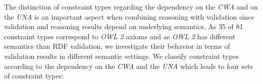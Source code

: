 \documentclass{acm_proc_article-sp}
\newcommand{\ms}[1]{%
  \texttt{#1}
}
\begin{document}
The distinction of constraint types regarding the dependency on the \emph{CWA} and on the \emph{UNA} is an important aspect when combining reasoning with validation
since validation and reasoning results depend on underlying semantics.
As 35 of 81 constraint types correspond to \emph{OWL 2} axioms and as \emph{OWL 2} has different semantics than RDF validation, 
we investigate their behavior in terms of validation results in different semantic settings. 
We classify constraint types according to the dependency on the \emph{CWA} and the \emph{UNA} which leads to four sets of constraint types:
\end{document}

